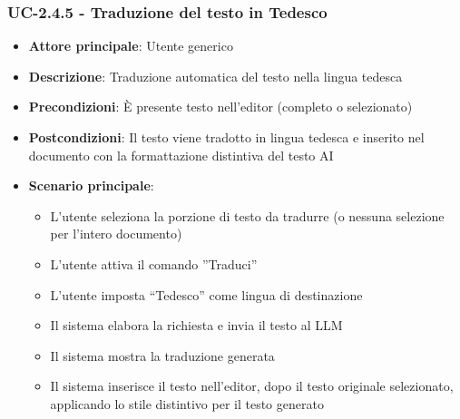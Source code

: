 \documentclass[11pt,a4paper]{article}
\begin{document}
\subsubsection{UC-2.4.5 - Traduzione del testo in Tedesco}
\begin{itemize}
    \item \textbf{Attore principale}: Utente generico
    \item \textbf{Descrizione}: Traduzione automatica del testo nella lingua tedesca
    \item \textbf{Precondizioni}: È presente testo nell’editor (completo o selezionato)
    \item \textbf{Postcondizioni}: Il testo viene tradotto in lingua tedesca e inserito nel documento con la formattazione distintiva del testo AI
    \item \textbf{Scenario principale}:
    \begin{itemize}
        \item L’utente seleziona la porzione di testo da tradurre (o nessuna selezione per l'intero documento)
        \item L’utente attiva il comando ”Traduci”
        \item L’utente imposta “Tedesco” come lingua di destinazione
        \item Il sistema elabora la richiesta e invia il testo al LLM
        \item Il sistema mostra la traduzione generata
        \item Il sistema inserisce il testo nell'editor, dopo il testo originale selezionato, applicando lo stile distintivo per il testo generato
    \end{itemize}
\end{itemize}
\end{document}
